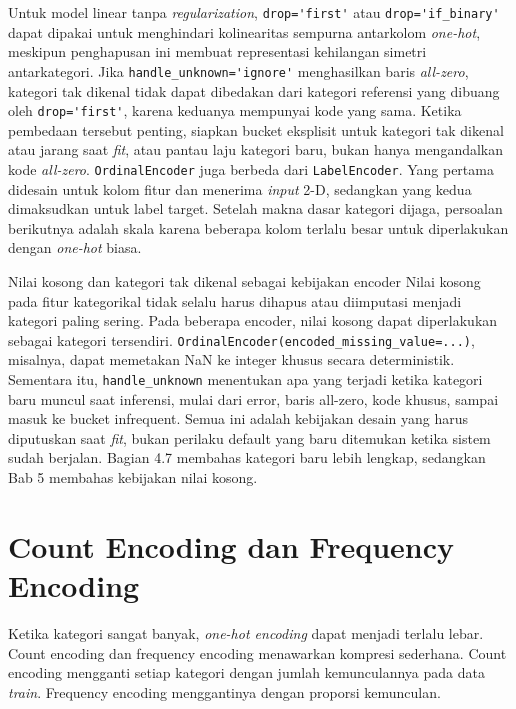 Untuk model linear tanpa \emph{regularization}, \passthrough{\lstinline!drop='first'!} atau \passthrough{\lstinline!drop='if_binary'!} dapat dipakai untuk menghindari kolinearitas sempurna antarkolom \emph{one-hot}, meskipun penghapusan ini membuat representasi kehilangan simetri antarkategori. Jika \passthrough{\lstinline!handle_unknown='ignore'!} menghasilkan baris \emph{all-zero}, kategori tak dikenal tidak dapat dibedakan dari kategori referensi yang dibuang oleh \passthrough{\lstinline!drop='first'!}, karena keduanya mempunyai kode yang sama. Ketika pembedaan tersebut penting, siapkan bucket eksplisit untuk kategori tak dikenal atau jarang saat \emph{fit}, atau pantau laju kategori baru, bukan hanya mengandalkan kode \emph{all-zero}. \passthrough{\lstinline!OrdinalEncoder!} juga berbeda dari \passthrough{\lstinline!LabelEncoder!}. Yang pertama didesain untuk kolom fitur dan menerima \emph{input} 2-D, sedangkan yang kedua dimaksudkan untuk label target. Setelah makna dasar kategori dijaga, persoalan berikutnya adalah skala karena beberapa kolom terlalu besar untuk diperlakukan dengan \emph{one-hot} biasa.

\begin{pendalaman}{Nilai kosong dan kategori tak dikenal sebagai kebijakan encoder}
Nilai kosong pada fitur kategorikal tidak selalu harus dihapus atau diimputasi menjadi kategori paling sering. Pada beberapa encoder, nilai kosong dapat diperlakukan sebagai kategori tersendiri. \passthrough{\lstinline!OrdinalEncoder(encoded_missing_value=...)!}, misalnya, dapat memetakan NaN ke integer khusus secara deterministik. Sementara itu, \passthrough{\lstinline!handle_unknown!} menentukan apa yang terjadi ketika kategori baru muncul saat inferensi, mulai dari error, baris all-zero, kode khusus, sampai masuk ke bucket infrequent. Semua ini adalah kebijakan desain yang harus diputuskan saat \emph{fit}, bukan perilaku default yang baru ditemukan ketika sistem sudah berjalan. Bagian 4.7 membahas kategori baru lebih lengkap, sedangkan Bab 5 membahas kebijakan nilai kosong.
\end{pendalaman}

\section{Count Encoding dan Frequency Encoding}\label{count-encoding-dan-frequency-encoding}

Ketika kategori sangat banyak, \emph{one-hot encoding} dapat menjadi terlalu lebar. Count encoding dan frequency encoding menawarkan kompresi sederhana. Count encoding mengganti setiap kategori dengan jumlah kemunculannya pada data \emph{train}. Frequency encoding menggantinya dengan proporsi kemunculan.

